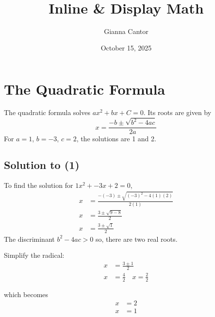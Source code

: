 \documentclass{article}
\title{Inline \& Display Math}
\author{Gianna Cantor}
\date{October 15, 2025}
\begin{document}
\maketitle

\section{The Quadratic Formula}
The quadratic formula solves $ax^2 + bx + C = 0$. Its roots are given by
    \begin{equation} \label{equation1}
        x = \frac{-b\pm\sqrt{b^2 - 4ac}}{2a}
    \end{equation}
For $a = 1$, $b = -3$, $c = 2$, the solutions are 1 and 2. 

\subsection{Solution to (1)}
To find the solution for $1x^2 + -3x + 2 = 0$,
    \begin{equation*}
    \begin{split}
        x & = \frac{-(-3)\pm\sqrt{(-3)^2 - 4(1)(2)}}{2(1)} \\
        x & = \frac{3\pm\sqrt{9 - 8}}{2} \\
        x & = \frac{3\pm\sqrt{1}}{2}
    \end{split}
    \end{equation*}
The discriminant $b^2 - 4ac > 0$ so, there are two real roots.

Simplify the radical:
    \begin{equation*}
    \begin{split}
        x & = \frac{3 \pm 1}{2} \\
        x & = \frac{4}{2} \quad x = \frac{2}{2}
    \end{split}
    \end{equation*}

which becomes
    \begin{equation*}
    \begin{split}
        x & = 2 \\
        x & = 1
    \end{split}
    \end{equation*}
    
\end{document}
